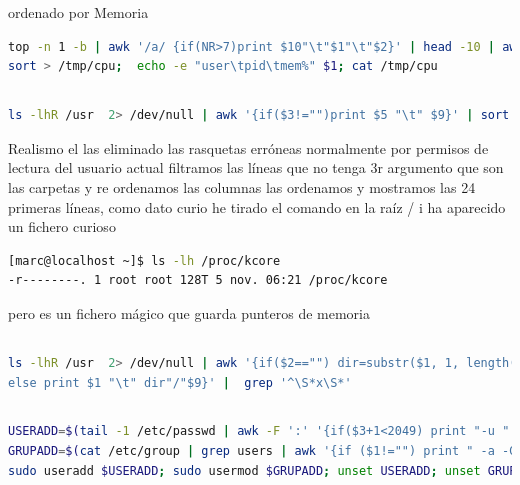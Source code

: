 \documentclass[preprint,11pt]{elsarticle}
\begin{document}
ordenado por Memoria

\begin{lstlisting}[language=bash,  basicstyle=\tiny,]
top -n 1 -b | awk '/a/ {if(NR>7)print $10"\t"$1"\t"$2}' | head -10 | awk '{print $3"\t"$2"\t"$1}' |
sort > /tmp/cpu;  echo -e "user\tpid\tmem%" $1; cat /tmp/cpu

\end{lstlisting}

\subsection{}
\begin{lstlisting}[language=bash,  basicstyle=\tiny,]
ls -lhR /usr  2> /dev/null | awk '{if($3!="")print $5 "\t" $9}' | sort -rh | head -24

\end{lstlisting}

Realismo el las eliminado las rasquetas erróneas normalmente por permisos de lectura del usuario actual filtramos las líneas que no tenga 3r argumento que son las carpetas y re ordenamos las columnas las ordenamos y mostramos las 24 primeras líneas, como dato curio he tirado el comando en la raíz / i ha aparecido un fichero curioso 
\begin{lstlisting}[language=bash,  basicstyle=\tiny,]
[marc@localhost ~]$ ls -lh /proc/kcore
-r--------. 1 root root 128T 5 nov. 06:21 /proc/kcore

\end{lstlisting}
pero es un fichero mágico que guarda punteros de memoria

\subsection{}
\begin{lstlisting}[language=bash,  basicstyle=\tiny,]
ls -lhR /usr  2> /dev/null | awk '{if($2=="") dir=substr($1, 1, length($1)-1);
else print $1 "\t" dir"/"$9}' |  grep '^\S*x\S*'

\end{lstlisting}

\subsection{}
\begin{lstlisting}[language=bash,  basicstyle=\tiny,]
USERADD=$(tail -1 /etc/passwd | awk -F ':' '{if($3+1<2049) print "-u " $3+1 " marc2"; else print "uid > 2048" }');
GRUPADD=$(cat /etc/group | grep users | awk '{if ($1!="") print " -a -G users marc2"; else sudo groupadd users}');
sudo useradd $USERADD; sudo usermod $GRUPADD; unset USERADD; unset GRUPADD 

\end{lstlisting}
\end{document}
